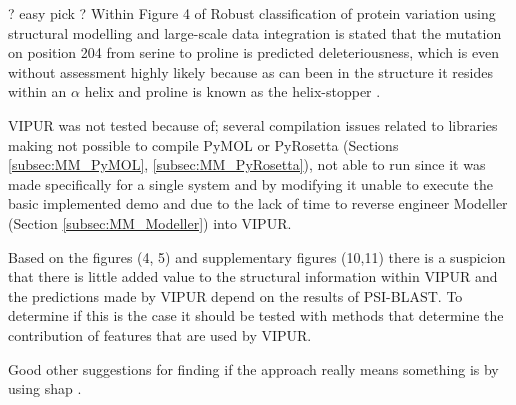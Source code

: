 
? easy pick ?
Within Figure 4 of Robust classification of protein variation using structural modelling and large-scale data integration \cite{} is stated that the mutation on position 204 from serine to proline is predicted deleteriousness, which is even without assessment highly likely because as can been in the structure it resides within an $\alpha$ helix and proline is known as the helix-stopper \cite{}.

VIPUR was not tested because of; several compilation issues related to libraries making not possible to compile PyMOL or PyRosetta (Sections \ref{subsec:MM_PyMOL}, \ref{subsec:MM_PyRosetta}), not able to run since it was made specifically for a single system and by modifying it unable to execute the basic implemented demo and due to the lack of time to reverse engineer Modeller (Section \ref{subsec:MM_Modeller}) into VIPUR. 


Based on the figures (4, 5) \cite{} and supplementary figures (10,11) \cite{} there is a suspicion that there is little added value to the structural information within VIPUR and the predictions made by VIPUR depend on the results of PSI-BLAST.
To determine if this is the case it should be tested with methods that determine the contribution of features that are used by VIPUR.


Good other suggestions for finding if the approach really means something is by using shap \cite{}.

